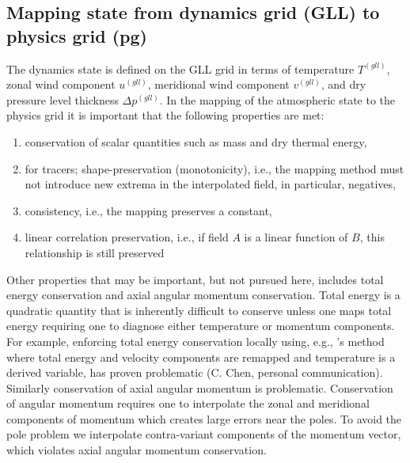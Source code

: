 \documentclass{ametsoc}
\begin{document}
\subsection{Mapping state from dynamics grid (GLL) to physics grid (pg)}
The dynamics state is defined on the GLL grid in terms of temperature $T^{(gll)}$, zonal wind component $u^{(gll)}$, meridional wind component $v^{(gll)}$, and dry pressure level thickness $\Delta p^{(gll)}$. In the mapping of the atmospheric state to the physics grid it is important that the following properties are met:
\begin{enumerate}
\item conservation of scalar quantities such as mass and dry thermal energy,\label{prop1}
\item for tracers; shape-preservation (monotonicity), i.e., the mapping method must not introduce new extrema in the interpolated field, in particular, negatives,\label{prop2}
\item consistency, i.e., the mapping preserves a constant,\label{prop3}
\item linear correlation preservation, i.e., if field $A$ is a linear function of $B$, this relationship is still preserved \citep[see, e.g, equation 5 in][]{LT2011QJR}
\end{enumerate}
Other properties that may be important, but not pursued here, includes total energy conservation and axial angular momentum conservation. Total energy is a quadratic quantity that is inherently difficult to conserve unless one maps total energy requiring one to diagnose either temperature or momentum components. For example, enforcing total energy conservation locally using, e.g., \citet{L2004MWR}'s method where total energy and velocity components are remapped and temperature is a derived variable, has proven problematic (C. Chen, personal communication). Similarly conservation of axial angular momentum is problematic. Conservation of angular momentum requires one to interpolate the zonal and meridional components of momentum which creates large errors near the poles. To avoid the pole problem we interpolate contra-variant components of the momentum vector, which violates axial angular momentum conservation.
\end{document}
